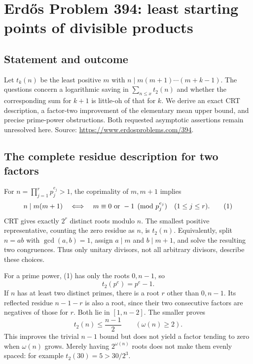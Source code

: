 \section*{Erd\H{o}s Problem 394: least starting points of divisible products}
\subsection*{Statement and outcome}
Let $t_k(n)$ be the least positive $m$ with $n\mid m(m+1)\cdots(m+k-1)$. The questions concern a logarithmic saving in $\sum_{n\le x}t_2(n)$ and whether the corresponding sum for $k+1$ is little-oh of that for $k$. We derive an exact CRT description, a factor-two improvement of the elementary mean upper bound, and precise prime-power obstructions. Both requested asymptotic assertions remain unresolved here. Source: \url{https://www.erdosproblems.com/394}.

\subsection*{The complete residue description for two factors}
For $n=\prod_{j=1}^r p_j^{e_j}>1$, the coprimality of $m,m+1$ implies
\[
 n\mid m(m+1)\quad\Longleftrightarrow\quad
 m\equiv0\ \hbox{or}\ -1\pmod{p_j^{e_j}}\quad(1\le j\le r). \tag{1}
\]
CRT gives exactly $2^r$ distinct roots modulo $n$. The smallest positive representative, counting the zero residue as $n$, is $t_2(n)$. Equivalently, split $n=ab$ with $\gcd(a,b)=1$, assign $a\mid m$ and $b\mid m+1$, and solve the resulting two congruences. Thus only unitary divisors, not all arbitrary divisors, describe these choices.

For a prime power, (1) has only the roots $0,n-1$, so
\[
 t_2(p^e)=p^e-1. \tag{2}
\]
If $n$ has at least two distinct primes, there is a root $r$ other than $0,n-1$. Its reflected residue $n-1-r$ is also a root, since their two consecutive factors are negatives of those for $r$. Both lie in $[1,n-2]$. The smaller proves
\[
 t_2(n)\le\frac{n-1}{2}\qquad(\omega(n)\ge2). \tag{3}
\]
This improves the trivial $n-1$ bound but does not yield a factor tending to zero when $\omega(n)$ grows. Merely having $2^{\omega(n)}$ roots does not make them evenly spaced: for example $t_2(30)=5>30/2^3$.

